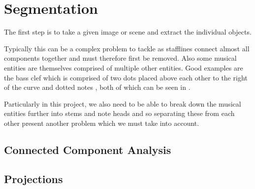 \section{Segmentation}

The first step is to take a given image or scene and extract the individual objects.

Typically this can be a complex problem to tackle as stafflines connect almost all components together and must therefore first be removed. Also some musical entities are themselves comprised of multiple other entities. Good examples are the bass clef which is comprised of two dots placed above each other to the right of the curve and dotted notes , both of which can be seen in .

Particularly in this project, we also need to be able to break down the musical entities further into stems and note heads and so separating these from each other present another problem which we must take into account.

\subsection{Connected Component Analysis}

\subsection{Projections}


